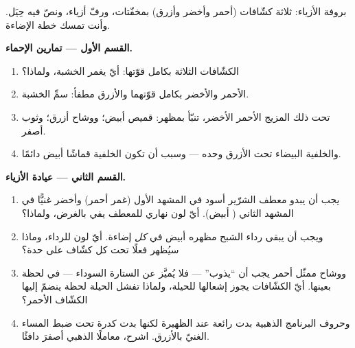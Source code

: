 \begin{problem}\label{pb:g8:colors-spectra:1}
بروفة الأزياء: ثلاثة كشّافات (أحمر وأخضر وأزرق) بمخفّتات، ورفّ
أزياء، ونصّ فيه حِيَل. وأنت تمسك خطة الإضاءة.

\medskip\noindent\textbf{القسم الأول --- تمارين الإحماء.}
\begin{enumerate}
  \item الكشّافات الثلاثة بكامل قوّتها: أيّ  يغمر الخشبة،
        ولماذا؟
  \item الأحمر والأخضر بكامل قوّتهما والأزرق مطفأ: سمِّ 
        الخشبة.
  \item تحت ذلك المزيج الأحمر الأخضر، تنبّأ بمظهر: قميص
        أبيض؛ ووشاح أزرق؛ وثوب أصفر.
  \item والخلفية البيضاء تحت الأزرق وحده --- وسبب أن تكون
        الخلفية قماشًا أبيض دائمًا.
\end{enumerate}

\medskip\noindent\textbf{القسم الثاني --- عيادة الأزياء.}
\begin{enumerate}[resume]
  \item يجب أن يبدو معطف الشرّير أسود في المشهد الأول (غمر
        أحمر) وأخضر غنيًّا في المشهد الثاني ( أبيض). أيّ
        لون نهاري للمعطف يفي بالغرض، ولماذا؟
  \item ويجب أن يبقى رداء الشبح مظهره أبيض في \emph{كل}
        إضاءة. أيّ لون للرداء، وماذا سيُظهر فعلًا تحت كل
        كشّاف على حدة؟
  \item ووشاح ممثّل أحمر يجب أن ``يذوب'' --- فلا يُميَّز عن
        الستارة السوداء --- في لحظة بعينها. أيّ الكشّافات
        يجوز إشعالها للحيلة، ولماذا تفشل الحيلة لحظة ينضمّ
        إليها الكشّاف الأحمر؟
  \item وحروف البرنامج الذهبية بدت رائعة عند الظهيرة لكنها
        بدت كدرة تحت ضبط المساء الغنيّ بالأزرق. اشرح، معاملًا
        الذهبي أصفرَ دافئًا.
\end{enumerate}


\end{problem}
